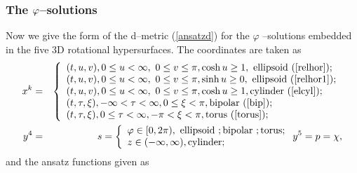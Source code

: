 \documentclass[a4paper,preprint,prabib,aps]{revtex4}
\begin{document}
\subsubsection{The $\protect\varphi$--solutions}

Now we give the form of the d--metric (\ref{ansatzd}) for the $\varphi $%
--solutions embedded in the five 3D rotational hypersurfaces. The
coordinates are taken as
\begin{eqnarray}
x^{k} &=&\left\{
\begin{array}{l}
(t,u,v),0\leq u<\infty ,\ 0\leq v\leq \pi ,\cosh u\geq 1,%
\mbox{ ellipsoid
(\ref{relhor})}; \\
(t,u,v),0\leq u<\infty ,\ 0\leq v\leq \pi ,\sinh u\geq 0,%
\mbox{ ellipsoid
(\ref{relhor1})}; \\
(t,u,v),0\leq u<\infty ,\ 0\leq v\leq \pi ,\cosh u\geq 1,%
\mbox{cylinder
(\ref{elcyl})}; \\
(t,\tau ,\xi ),-\infty <\tau <\infty ,0\leq \xi <\pi ,%
\mbox{bipolar
(\ref{bip})}; \\
(t,\tau ,\xi ),0\leq \tau <\infty ,-\pi <\xi <\pi ,%
\mbox{torus
(\ref{torus})};
\end{array}
\right.   \nonumber \\
y^{4} &=&s=\left\{
\begin{array}{l}
\varphi \in \lbrack 0,2\pi ),\mbox{ ellipsoid };\mbox{bipolar };\mbox{torus};
\\
z\in (-\infty ,\infty ),\mbox{cylinder};
\end{array}
\right. y^{5}=p=\chi ,  \nonumber
\end{eqnarray}
and the ansatz functions given as
\end{document}
